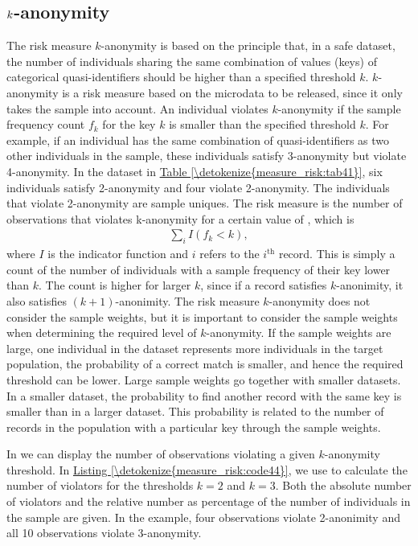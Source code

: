 \documentclass[letterpaper,10pt,english]{sphinxmanual}
\begin{document}
\subsection{\protect\(k\protect\)-anonymity}
\label{\detokenize{measure_risk:anonymity}}
The risk measure \(k\)-anonymity is based on the principle that, in a safe
dataset, the number of individuals sharing the same combination of
values (keys) of categorical quasi-identifiers should be higher than a
specified threshold \(k\). \(k\)-anonymity is a risk
measure based on the microdata to be released, since it only takes the
sample into account. An individual violates \(k\)-anonymity if the
sample frequency count \(f_{k}\) for the key \(k\) is smaller
than the specified threshold \(k\). For example, if an
individual has the same combination of quasi-identifiers as two other
individuals in the sample, these individuals satisfy 3-anonymity but
violate 4-anonymity. In the dataset in \hyperref[\detokenize{measure_risk:tab41}]{Table \ref{\detokenize{measure_risk:tab41}}}, six individuals
satisfy 2-anonymity and four violate 2-anonymity. The individuals that
violate 2-anonymity are sample uniques. The risk measure is the number
of observations that violates k-anonymity for a certain value of ,
which is
\begin{equation*}
\begin{split}\sum_{i}^{}{I(f_{k} < k)},\end{split}
\end{equation*}
where \(I\) is the indicator function and \(i\) refers to the
\(i\)$^{\text{th}}$ record. This is simply a count of the number of
individuals with a sample frequency of their key lower than \(k\).
The count is higher for larger \(k\), since if a record satisfies
\(k\)-anonimity, it also satisfies \((k + 1)\)-anonimity. The
risk measure \(k\)-anonymity does not consider the sample weights,
but it is important to consider the sample weights when determining the
required level of \(k\)-anonymity. If the sample weights are large,
one individual in the dataset represents more individuals in the target
population, the probability of a correct match is smaller, and hence the
required threshold can be lower. Large sample weights go together with
smaller datasets. In a smaller dataset, the probability to find another
record with the same key is smaller than in a larger dataset. This
probability is related to the number of records in the population with a
particular key through the sample weights.

In  we can display the number of observations violating a
given \(k\)-anonymity threshold. In \hyperref[\detokenize{measure_risk:code44}]{Listing \ref{\detokenize{measure_risk:code44}}}, we use 
to calculate the number of violators for the thresholds \(k = 2\)
and \(k = 3\). Both the absolute number of violators and the
relative number as percentage of the number of individuals in the sample
are given. In the example, four observations violate 2-anonimity and all
10 observations violate 3-anonymity.
\end{document}
